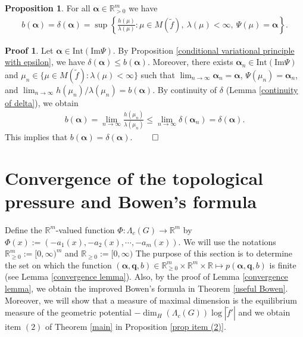 \documentclass{article}
\theoremstyle{definition}
\newtheorem{prop}[thm]{Proposition}
\newtheorem*{pf}{Proof}
\begin{document}
\begin{prop}\label{improve}
    For all $\boldsymbol{\alpha}\in\mathbb{R}^m_{>0}$ we have
    \begin{align}\label{eq;variatnal}
        b(\boldsymbol{\alpha})=\delta(\boldsymbol{\alpha})=\sup\left\{\frac{h(\mu)}{\lambda(\mu)}:\mu\in M(\tilde f),\ \lambda(\mu)<\infty,\ \Psi(\mu)=\boldsymbol{\alpha}\right\}.
    \end{align}
\end{prop}




\begin{pf}
Let $\boldsymbol{\alpha}\in \text{Int}(\text{Im}\Psi)$. By Proposition \ref{conditional variational principle with epsilon}, we have $\delta(\boldsymbol{\alpha})\leq b(\boldsymbol{\alpha})$.
Moreover, there exists $\boldsymbol{\alpha}_n\in \text{Int}(\text{Im}\Psi)$ and $\mu_n\in\lbrace \mu \in {M}({\tilde f}): \lambda(\mu)<\infty \rbrace$ such that $\lim_{n\to\infty}\boldsymbol{\alpha}_n=\boldsymbol{\alpha}$, $\Psi(\mu_n)=\boldsymbol{\alpha}_{n}$, and $\lim_{n\to\infty}h(\mu_n)/\lambda(\mu_n)=b(\boldsymbol{\alpha})$. By continuity of $\delta$ (Lemma \ref{continuity of delta}), we obtain
\begin{align}
b(\boldsymbol{\alpha})=\lim_{n\to\infty}\frac{h(\mu_n)}{\lambda(\mu_n)}\leq\lim_{n\to\infty}\delta(\boldsymbol{\alpha}_n)=\delta(\boldsymbol{\alpha}).\nonumber
\end{align}
This implies that $b(\boldsymbol{\alpha})=\delta(\boldsymbol{\alpha})$.
$\qed$
\end{pf}















\section{Convergence of the topological pressure and Bowen's formula}\label{Convergence of the topological pressure and Bowen's formula}
 Define the $\mathbb{R}^m$-valued function
    $\Phi:\Lambda_c(G)\rightarrow \mathbb{R}^m$ by $\Phi(x):=(-a_1(x),-a_2(x),\cdots,-a_m(x)). \nonumber$
We will use the notations $\mathbb{R}_{\geq0}^m:=[0,\infty)^m$ and $\mathbb{R}_{\geq0}:=[0,\infty)$    
The purpose of this section is to determine the set on which the function $(\boldsymbol{\alpha},\boldsymbol{q},b)\in\mathbb{R}_{\geq 0}^m\times\mathbb{R}^m\times\mathbb{R}\mapsto p(\boldsymbol{\alpha},\boldsymbol{q},b)$ is finite (see Lemma \ref{convergence lemma}). Also, by the proof of Lemma \ref{convergence lemma}, we obtain the improved Bowen's formula in Theorem \ref{useful Bowen}. Moreover, we will show that a measure of maximal dimension is the equilibrium measure of the geometric potential $-\dim_H(\Lambda_c(G))\log|\tilde f'|$ and we obtain item $(2)$ of Theorem \ref{main} in Proposition \ref{prop item (2)}. 
\end{document}
